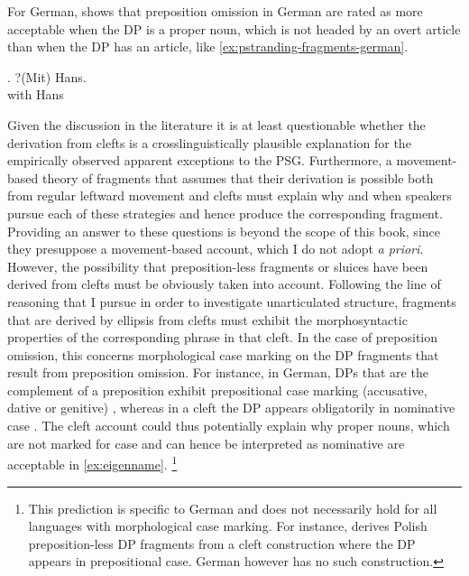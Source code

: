 For German, \citet{lemkeaccepted} shows that preposition omission in German are rated as more acceptable when the DP is a proper noun, which is not headed by an overt article \Next than when the DP has an article, like \ref{ex:pstranding-fragments-german}.

\exg. 
?(Mit) Hans.\label{ex:eigenname}\\
with Hans\\

Given the discussion in the literature it is at least questionable whether the derivation from clefts is a crosslinguistically plausible explanation for the empirically observed apparent exceptions to the PSG. Furthermore, a movement-based theory of fragments that assumes that their derivation is possible both from regular leftward movement and clefts must explain why and when speakers pursue each of these strategies and hence produce the corresponding fragment. Providing an answer to these questions is beyond the scope of this book, since they presuppose a movement-based account, which I do not adopt \textit{a priori}. However, the possibility that preposition-less fragments or sluices have been derived from clefts must be obviously taken into account. Following the line of reasoning that I pursue in order to investigate unarticulated structure, fragments that are derived by ellipsis from clefts must exhibit the morphosyntactic properties of the corresponding phrase in that cleft. In the case of preposition omission, this concerns morphological case marking on the DP fragments that result from preposition omission. For instance, in German, DPs that are the complement of a preposition exhibit prepositional case marking (accusative, dative or genitive) \Next[a], whereas in a cleft the DP appears obligatorily in nominative case \Next[b]. The cleft account could thus potentially explain why proper nouns, which are not marked for case and can hence be interpreted as nominative are acceptable in \ref{ex:eigenname}.%
%
\footnote{This prediction is specific to German and does not necessarily hold for all languages with morphological case marking. For instance, \citet{szczegielniak2008} derives Polish preposition-less DP fragments from a cleft construction where the DP appears in prepositional case. German however has no such construction.}\afterfn%
